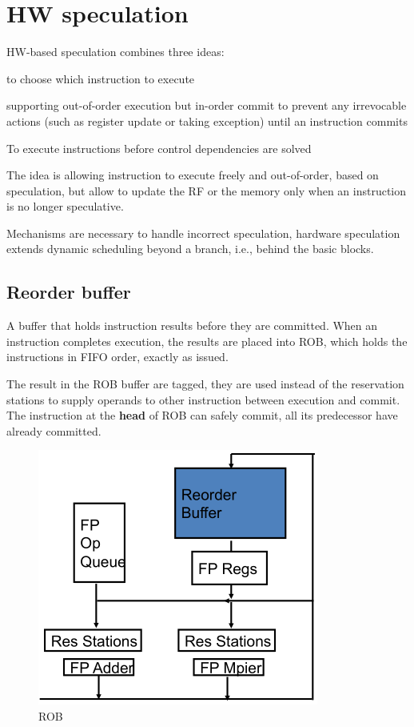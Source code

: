 
\section{HW speculation}\label{sec:hw-speculation}
HW-based speculation combines three ideas:
\begin{description}[noitemsep]
    \item[Dynamic Branch Prediction] to choose which instruction to execute
    \item[Dynamic Scheduling] supporting out-of-order execution but in-order commit to prevent any irrevocable
    actions (such as register update or taking exception) until an instruction commits
    \item[Speculation] To execute instructions before control dependencies are solved
\end{description}
The idea is allowing instruction to execute freely and out-of-order, based on speculation, but allow to update the RF
or the memory only when an instruction is no longer speculative.

Mechanisms are necessary to handle incorrect speculation, hardware speculation extends dynamic scheduling beyond a
branch, i.e., behind the basic blocks.

\subsection{Reorder buffer}\label{subsec:reorder-buffer}
A buffer that holds instruction results before they are committed.
When an instruction completes execution, the results are placed into ROB, which holds the instructions in FIFO order,
exactly as issued.

The result in the ROB buffer are tagged, they are used instead of the reservation stations to supply operands to
other instruction between execution and commit.\\
The instruction at the \textbf{head} of ROB can safely commit, all its predecessor have already committed.

\begin{figure}[h]
    \centering
    \includegraphics[scale = 0.4]{images/reorder-buffer}
    \caption{ROB}
    \label{fig:rob}
\end{figure}

